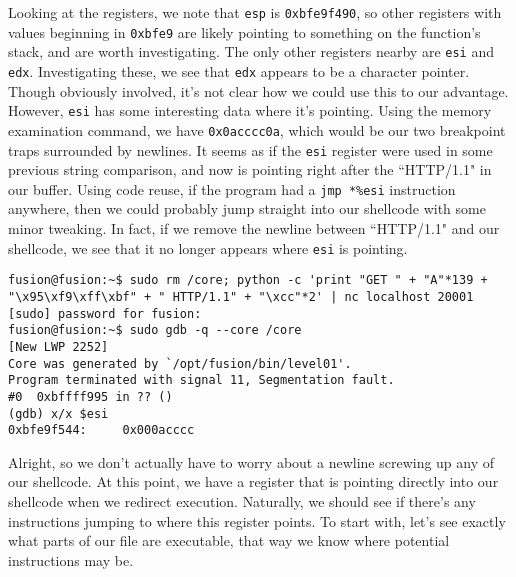Looking at the registers, we note that \texttt{esp} is \texttt{0xbfe9f490},
so other registers with values beginning in \texttt{0xbfe9} are likely 
pointing to something on the function's stack, and are worth investigating.
The only other registers nearby are \texttt{esi} and \texttt{edx}. Investigating
these, we see that \texttt{edx} appears to be a character pointer. Though
obviously involved, it's not clear how we could use this to our advantage.
However, \texttt{esi} has some interesting data where it's pointing.
Using the memory examination command, we have \texttt{0x0acccc0a}, which would
be our two breakpoint traps surrounded by newlines. It seems as if
the \texttt{esi} register were used in some previous string comparison, and
now is pointing right after the ``HTTP/1.1" in our buffer. Using code reuse,
if the program had a \texttt{jmp *\%esi} instruction anywhere, then we 
could probably jump straight into our shellcode with some minor tweaking.
In fact, if we remove the newline between ``HTTP/1.1" and our shellcode,
we see that it no longer appears where \texttt{esi} is pointing.

\begin{lstlisting}
fusion@fusion:~$ sudo rm /core; python -c 'print "GET " + "A"*139 + "\x95\xf9\xff\xbf" + " HTTP/1.1" + "\xcc"*2' | nc localhost 20001
[sudo] password for fusion: 
fusion@fusion:~$ sudo gdb -q --core /core
[New LWP 2252]
Core was generated by `/opt/fusion/bin/level01'.
Program terminated with signal 11, Segmentation fault.
#0  0xbffff995 in ?? ()
(gdb) x/x $esi
0xbfe9f544:     0x000acccc
\end{lstlisting}

Alright, so we don't actually have to worry about a newline screwing up any of our
shellcode. At this point, we have a register that is pointing directly
into our shellcode when we redirect execution. Naturally, we should
see if there's any instructions jumping to where this register points.
To start with, let's see exactly what parts of our file are executable,
that way we know where potential instructions may be.

